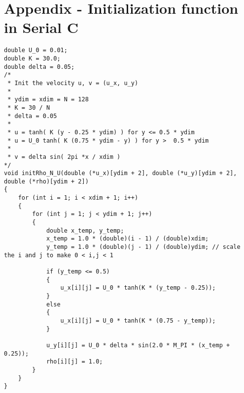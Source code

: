\appendix
\section{Appendix - Initialization function in Serial C} \label{app:a}
\begin{verbatim}
double U_0 = 0.01;
double K = 30.0;
double delta = 0.05;
/*
 * Init the velocity u, v = (u_x, u_y)
 * 
 * ydim = xdim = N = 128
 * K = 30 / N
 * delta = 0.05
 * 
 * u = tanh( K (y - 0.25 * ydim) ) for y <= 0.5 * ydim 
 * u = U_0 tanh( K (0.75 * ydim - y) ) for y >  0.5 * ydim
 * 
 * v = delta sin( 2pi *x / xdim )
*/
void initRho_N_U(double (*u_x)[ydim + 2], double (*u_y)[ydim + 2], double (*rho)[ydim + 2])
{
    for (int i = 1; i < xdim + 1; i++)
    {
        for (int j = 1; j < ydim + 1; j++)
        {
            double x_temp, y_temp;
            x_temp = 1.0 * (double)(i - 1) / (double)xdim;
            y_temp = 1.0 * (double)(j - 1) / (double)ydim; // scale the i and j to make 0 < i,j < 1

            if (y_temp <= 0.5)
            {
                u_x[i][j] = U_0 * tanh(K * (y_temp - 0.25));
            }
            else
            {
                u_x[i][j] = U_0 * tanh(K * (0.75 - y_temp));
            }

            u_y[i][j] = U_0 * delta * sin(2.0 * M_PI * (x_temp + 0.25));
            rho[i][j] = 1.0;
        }
    }
}
\end{verbatim}